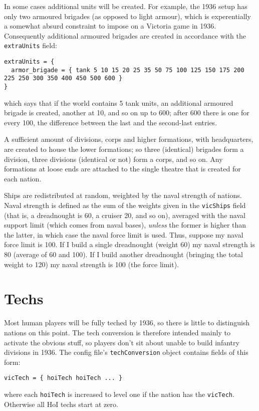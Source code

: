 \documentclass[12pt,ebook,oneside]{book}
\begin{document}
In some cases additional units will be created. For example, the 1936
setup has only two armoured brigades (as opposed to light armour),
which is experentially a somewhat absurd constraint to impose on a
Victoria game in 1936. Consequently additional armoured brigades are
created in accordance with the \texttt{extraUnits} field:
\begin{verbatim}
extraUnits = {
  armor_brigade = { tank 5 10 15 20 25 35 50 75 100 125 150 175 200 225 250 300 350 400 450 500 600 }
}
\end{verbatim}
which says that if the world contains 5 tank units, an additional
armoured brigade is created, another at 10, and so on up to 600; after
600 there is one for every 100, the difference between the last and
the second-last entries. 

A sufficient amount of divisions, corps and higher formations, with headquarters, are created to
house the lower formations; so three (identical) brigades form a
division, three divisions (identical or not) form a corps, and so
on. Any formations at loose ends are attached to the single theatre
that is created for each nation. 

Ships are redistributed at random, weighted by the naval strength of
nations. Naval strength is defined as the sum of the weights given in
the \texttt{vicShips} field (that is, a dreadnought is 60, a cruiser
20, and so on), averaged with the naval support limit (which comes
from naval bases), \emph{unless} the former is higher than the latter,
in which case the naval force limit is used. Thus, suppose my naval
force limit is 100. If I build a single dreadnought (weight 60) my
naval strength is 80 (average of 60 and 100). If I build another
dreadnought (bringing the total weight to 120) my naval strength is
100 (the force limit). 

\section{Techs}

Most human players will be fully teched by 1936, so there is little to
distinguish nations on this point. The tech conversion is therefore
intended mainly to activate the obvious stuff, so players don't sit
about unable to build infantry divisions in 1936. The config file's
\texttt{techConversion} object contains fields of this form:
\begin{verbatim}
vicTech = { hoiTech hoiTech ... }
\end{verbatim}
where each \texttt{hoiTech} is increased to level one if the nation
has the \texttt{vicTech}. Otherwise all HoI techs start at zero. 
\end{document}
